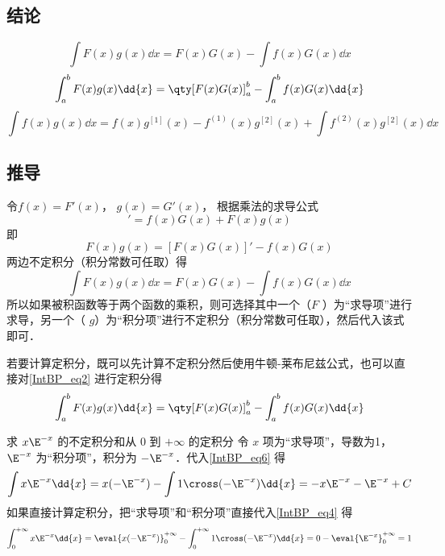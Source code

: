 

\subsection{结论}
\begin{equation}\label{IntBP_eq1}
\int F(x)g(x)\dd{x}  = F(x)G(x) - \int f(x)G(x)\dd{x}
\end{equation}
\begin{equation}
\int_a^b F(x)g(x) \dd{x}  = \qty[ F(x)G(x) ]_a^b - \int_a^b f(x)G(x) \dd{x}
\end{equation}
\begin{equation}
\int f(x)g(x) \dd{x}  = f(x){g^{[1]}}(x) - {f^{(1)}}(x){g^{[2]}}(x) + \int f^{(2)}(x) g^{[2]}(x) \dd{x}
\end{equation}

\subsection{推导}
令$f(x) = F'(x)$，  $g(x) = G'(x)$， 根据乘法的求导公式%
\begin{equation}
[F(x)G(x)]' = f(x)G(x) + F(x)g(x)
\end{equation}
即
\begin{equation}\label{IntBP_eq2}
F(x)g(x) = [F(x)G(x)]' - f(x)G(x)
\end{equation}
两边不定积分（积分常数可任取）得
\begin{equation}\label{IntBP_eq6}
\int F(x)g(x) \dd{x}  = F(x)G(x) - \int f(x)G(x) \dd{x}
\end{equation}
所以如果被积函数等于两个函数的乘积，则可选择其中一个（$F$ ）为“求导项”进行求导，另一个（ $g$）为“积分项”进行不定积分（积分常数可任取），然后代入该式即可．

若要计算定积分，既可以先计算不定积分然后使用牛顿-莱布尼兹公式，也可以直接对\autoref{IntBP_eq2} 进行定积分得
\begin{equation}\label{IntBP_eq4}
\int_a^b F(x)g(x) \dd{x}  = \qty[ F(x)G(x) ]_a^b - \int_a^b f(x)G(x) \dd{x}
\end{equation}

\begin{exam}{求 $x{\E^{ - x}}$ 的不定积分和从 $0$ 到 $+\infty$ 的定积分}
令 $x$ 项为“求导项”，导数为1， $\E^{ - x}$ 为“积分项”，积分为 $- \E^{ - x}$．代入\autoref{IntBP_eq6} 得
\begin{equation}
\int x{\E^{ - x}} \dd{x}  = x( - {\E^{ - x}}) - \int 1 \cross ( - {\E^{ - x}}) \dd{x}  =  - x{\E^{ - x}} - {\E^{ - x}} + C
\end{equation}
如果直接计算定积分，把“求导项”和“积分项”直接代入\autoref{IntBP_eq4} 得
\begin{equation}
\int_0^{+\infty} x \E^{ - x} \dd{x}  = \eval{ x( - \E^{ - x}) }_0^{ + \infty } - \int_0^{ + \infty } 1 \cross (-\E^{ - x}) \dd{x}  = 0 - \eval{ \E^{ - x} }_0^{ + \infty } = 1
\end{equation}
\end{exam}

